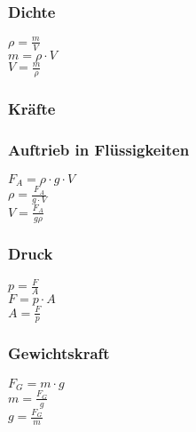 \subsubsection{Dichte} 
\begin{minipage}{0.45\textwidth} 
$ \rho  = \frac{m}{V} $\\ 
$ m = \rho \cdot V $\\ 
$ V = \frac{m}{\rho } $\\ 
\end{minipage} 
\begin{minipage}{0.45\textwidth} 
 
\end{minipage} 
\subsubsection{Kräfte} 
\begin{minipage}{0.45\textwidth} 
\end{minipage} 
\begin{minipage}{0.45\textwidth} 
 
\end{minipage} 
\subsubsection{Auftrieb in Flüssigkeiten} 
\begin{minipage}{0.45\textwidth} 
$ F_{A}  =  \rho \cdot g\cdot V $\\ 
$ \rho  = \frac{F_{A} }{g\cdot V} $\\ 
$ V = \frac{F_{A} }{g \rho } $\\ 
\end{minipage} 
\begin{minipage}{0.45\textwidth} 
 
\end{minipage} 
\subsubsection{Druck} 
\begin{minipage}{0.45\textwidth} 
$ p = \frac{F}{A} $\\ 
$ F = p\cdot A $\\ 
$ A = \frac{F}{p} $\\ 
\end{minipage} 
\begin{minipage}{0.45\textwidth} 
 
\end{minipage} 
\subsubsection{Gewichtskraft} 
\begin{minipage}{0.45\textwidth} 
$ F_{G}  = m\cdot g $\\ 
$ m = \frac{F_{G} }{g} $\\ 
$ g = \frac{F_{G} }{m} $\\ 
\end{minipage} 
\begin{minipage}{0.45\textwidth} 
 
\end{minipage} 
